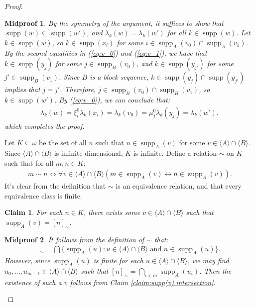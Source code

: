 \documentclass[10pt,a4paper]{amsart}
\newtheorem{claim}{Claim}
\newtheorem{midproof}{Midproof}
\renewcommand{\c}[1]{\langle #1 \rangle}
\newcommand{\func}{\operatorname}
\newcommand{\supp}{\func{supp}}
\begin{document}
\begin{proof}
\begin{midproof}
        By the symmetry of the argument, it suffices to show that $\supp(w) \subseteq \supp(w')$, and $\lambda_k(w) = \lambda_k(w')$ for all $k \in \supp(w)$. Let $k \in \supp(w)$, so $k \in \supp(x_i)$ for some $i \in \supp_A(v_0) \cap \supp_A(v_1)$. By the second equalities in (\ref{eq:v_0}) and (\ref{eq:v_1}), we have that $k \in \supp(y_j)$ for some $j \in \supp_B(v_0)$, and $k \in \supp(y_{j'})$ for some $j' \in \supp_B(v_1)$. Since $B$ is a block sequence, $k \in \supp(y_j) \cap \supp(y_{j'})$ implies that $j = j'$. Therefore, $j \in \supp_B(v_0) \cap \supp_B(v_1)$, so $k \in \supp(w')$. By (\ref{eq:v_0}), we can conclude that:
        \begin{align*}
            \lambda_k(w) = \xi_i^0\lambda_k(x_i) = \lambda_k(v_0) = \mu_j^0\lambda_k(y_j) = \lambda_k(w'),
        \end{align*}
        which completes the proof. 
    \end{midproof}
    
    Let $K \subseteq \omega$ be the set of all $n$ such that $n \in \supp_A(v)$ for some $v \in \c{A} \cap \c{B}$. Since $\c{A} \cap \c{B}$ is infinite-dimensional, $K$ is infinite. Define a relation $\sim$ on $K$ such that for all $m,n \in K$:
    \begin{align*}
        m \sim n \iff \forall v \in \c{A} \cap \c{B}(m \in \supp_A(v) \leftrightarrow n \in \supp_A(v)).
    \end{align*}
    It's clear from the definition that $\sim$ is an equivalence relation, and that every equivalence class is finite. 

    \begin{claim}
        For each $n \in K$, there exists some $v \in \c{A} \cap \c{B}$ such that $\supp_A(v) = [n]_\sim$. 
    \end{claim}

    \begin{midproof}
        It follows from the definition of $\sim$ that:
        \begin{align*}
            [n]_\sim = \bigcap\{\supp_A(u) : u \in \c{A} \cap \c{B} \text{ and } n \in \supp_A(u)\}.
        \end{align*}
        However, since $\supp_A(u)$ is finite for each $u \in \c{A} \cap \c{B}$, we may find $u_0,\dots,u_{m-1} \in \c{A} \cap \c{B}$ such that $[n]_\sim = \bigcap_{i<m} \supp_A(u_i)$. Then the existence of such a $v$ follows from Claim \ref{claim:supp(v).intersection}.
    \end{midproof}


\end{proof}
\end{document}
